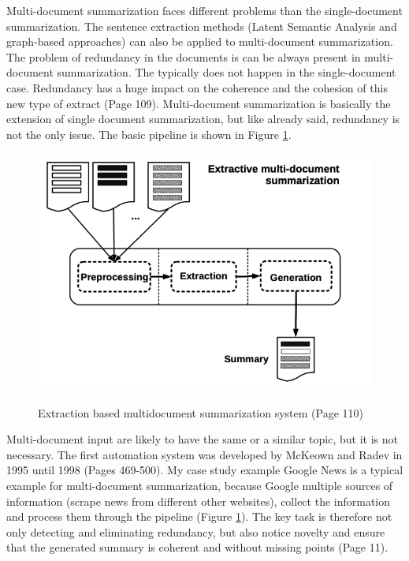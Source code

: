 Multi-document summarization faces different problems than the single-document summarization. The sentence extraction methods (Latent Semantic Analysis and graph-based approaches) can also be applied to multi-document summarization. The problem of redundancy in the documents is can be always present in multi-document summarization. The typically does not happen in the single-document case. Redundancy has a huge impact on the coherence and the cohesion of this new type of extract \cite{juan} (Page 109). Multi-document summarization is basically the extension of single document summarization, but like already said, redundancy is not the only issue. The basic pipeline is shown in Figure \ref{multi}. 

\begin{figure}
	\begin{center}
		\includegraphics[width=4.5in]{photos/multidoc}\\
		\caption{Extraction based multidocument summarization system \cite{juan} (Page 110)}\label{multi}
	\end{center}
\end{figure}

Multi-document input are likely to have the same or a similar topic, but it is not necessary. The first automation system was developed by McKeown and Radev in 1995 until 1998 \cite{radev-mckeown-1998-generating} (Pages 469-500). My case study example Google News is a typical example for multi-document summarization, because Google multiple sources of information (scrape news from different other websites), collect the information and process them through the pipeline (Figure \ref{multi}). The key task is therefore not only detecting and eliminating redundancy, but also notice novelty and ensure that the generated summary is coherent and without missing points \cite{Das07asurvey} (Page 11).
 
